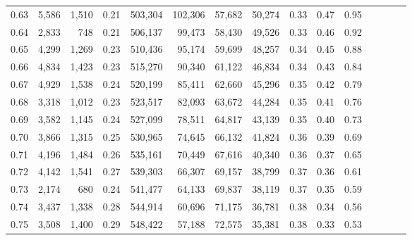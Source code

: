 \begin{tabular}{rrrcrrrrrrrrrrr}
0.63 &   5,586 &  1,510 &                                       0.21 &  503,304 &  102,306 &   57,682 &   50,274 &  0.33 &  0.47 &                         0.95 \\
0.64 &   2,833 &    748 &                                       0.21 &  506,137 &   99,473 &   58,430 &   49,526 &  0.33 &  0.46 &                         0.92 \\
0.65 &   4,299 &  1,269 &                                       0.23 &  510,436 &   95,174 &   59,699 &   48,257 &  0.34 &  0.45 &                         0.88 \\
0.66 &   4,834 &  1,423 &                                       0.23 &  515,270 &   90,340 &   61,122 &   46,834 &  0.34 &  0.43 &                         0.84 \\
0.67 &   4,929 &  1,538 &                                       0.24 &  520,199 &   85,411 &   62,660 &   45,296 &  0.35 &  0.42 &                         0.79 \\
0.68 &   3,318 &  1,012 &                                       0.23 &  523,517 &   82,093 &   63,672 &   44,284 &  0.35 &  0.41 &                         0.76 \\
0.69 &   3,582 &  1,145 &                                       0.24 &  527,099 &   78,511 &   64,817 &   43,139 &  0.35 &  0.40 &                         0.73 \\
0.70 &   3,866 &  1,315 &                                       0.25 &  530,965 &   74,645 &   66,132 &   41,824 &  0.36 &  0.39 &                         0.69 \\
0.71 &   4,196 &  1,484 &                                       0.26 &  535,161 &   70,449 &   67,616 &   40,340 &  0.36 &  0.37 &                         0.65 \\
0.72 &   4,142 &  1,541 &                                       0.27 &  539,303 &   66,307 &   69,157 &   38,799 &  0.37 &  0.36 &                         0.61 \\
0.73 &   2,174 &    680 &                                       0.24 &  541,477 &   64,133 &   69,837 &   38,119 &  0.37 &  0.35 &                         0.59 \\
0.74 &   3,437 &  1,338 &                                       0.28 &  544,914 &   60,696 &   71,175 &   36,781 &  0.38 &  0.34 &                         0.56 \\
0.75 &   3,508 &  1,400 &                                       0.29 &  548,422 &   57,188 &   72,575 &   35,381 &  0.38 &  0.33 &                         0.53 \\

\end{tabular}
